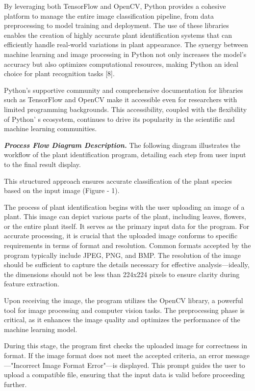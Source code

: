 \begin{multicols}{2}
By leveraging both TensorFlow and OpenCV, Python provides a cohesive
platform to manage the entire image classification pipeline, from data
preprocessing to model training and deployment. The use of these
libraries enables the creation of highly accurate plant identification
systems that can efficiently handle real-world variations in plant
appearance. The synergy between machine learning and image processing in
Python not only increases the model's accuracy but also optimizes
computational resources, making Python an ideal choice for plant
recognition tasks {[}8{]}.

Python's supportive community and comprehensive documentation for
libraries such as TensorFlow and OpenCV make it accessible even for
researchers with limited programming backgrounds. This accessibility,
coupled with the flexibility of Python' s ecosystem,
continues to drive its popularity in the scientific and machine learning
communities.

\emph{{\bfseries Process Flow Diagram Description.}} The following diagram
illustrates the workflow of the plant identification program, detailing
each step from user input to the final result display.

This structured approach ensures accurate classification of the plant
species based on the input image (Figure - 1).

The process of plant identification begins with the user uploading an
image of a plant. This image can depict various parts of the plant,
including leaves, flowers, or the entire plant itself. It serves as the
primary input data for the program. For accurate processing, it is
crucial that the uploaded image conforms to specific requirements in
terms of format and resolution. Common formats accepted by the program
typically include JPEG, PNG, and BMP. The resolution of the image should
be sufficient to capture the details necessary for effective
analysis---ideally, the dimensions should not be less than 224x224
pixels to ensure clarity during feature extraction.

Upon receiving the image, the program utilizes the OpenCV library, a
powerful tool for image processing and computer vision tasks. The
preprocessing phase is critical, as it enhances the image quality and
optimizes the performance of the machine learning model.

During this stage, the program first checks the uploaded image for
correctness in format. If the image format does not meet the accepted
criteria, an error message---"Incorrect Image Format Error"---is
displayed. This prompt guides the user to upload a compatible file,
ensuring that the input data is valid before proceeding further.


\end{multicols}
